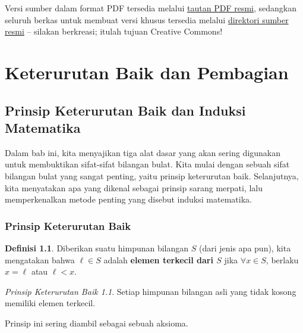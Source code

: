 \documentclass[12pt,letterpaper]{amsbook}
\theoremstyle{definition}
\newtheorem{definition}[theorem]{Definisi}
\theoremstyle{remark}
\newtheorem*{WOprinciple}{Prinsip Keterurutan Baik}
\numberwithin{figure}{section}
\numberwithin{exercise}{section}
\numberwithin{section}{chapter}
\numberwithin{equation}{section}
\numberwithin{table}{section}
\newenvironment{releasenotes}{}{}
\newenvironment{discussion}{}{}
\begin{document}
\begin{releasenotes}
\vskip1cm

Versi sumber dalam format PDF tersedia melalui
\href{https://www.poritz.net/jonathan/share/yaintt.pdf}{tautan PDF resmi},
sedangkan seluruh berkas untuk membuat versi khusus tersedia melalui
\href{https://poritz.net/jonathan/share/yaintt/}{direktori sumber resmi}
-- silakan berkreasi; itulah tujuan Creative Commons!
\end{releasenotes}


\ifdefined\suppressToC
  {}
\else
  \tableofcontents
\fi

\mainmatter

\chapter{Keterurutan Baik dan Pembagian}\label{chap:WOaD}

\section{Prinsip Keterurutan Baik dan Induksi Matematika}
\label{sec:WOPaMI}
\begin{discussion}
Dalam bab ini, kita menyajikan tiga alat dasar yang akan sering digunakan untuk
membuktikan sifat-sifat bilangan bulat. Kita mulai dengan sebuah sifat bilangan
  bulat yang sangat penting, yaitu prinsip keterurutan baik. Selanjutnya, kita
  menyatakan apa yang dikenal sebagai prinsip sarang merpati, lalu memperkenalkan
metode penting yang disebut induksi matematika.
\end{discussion}

\subsection{\textbf{Prinsip Keterurutan Baik}}

\begin{definition}
Diberikan suatu himpunan bilangan $S$ (dari jenis apa pun), kita mengatakan
bahwa $\ell\in S$ adalah {\bf elemen terkecil dari $S$} jika
$\forall x\in S$, berlaku $x=\ell$ atau $\ell<x$.
\end{definition}

\begin{WOprinciple}
Setiap himpunan bilangan asli yang tidak kosong memiliki elemen terkecil.
\end{WOprinciple}

\begin{discussion}
Prinsip ini sering diambil sebagai sebuah aksioma.
\end{discussion}
\end{document}
